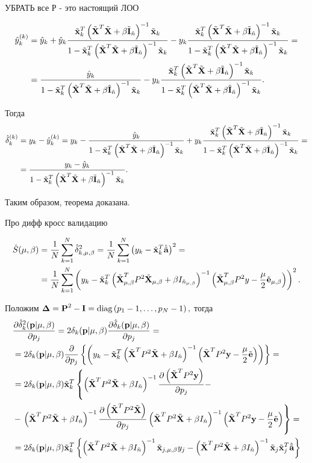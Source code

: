 УБРАТЬ все Р - это настоящий ЛОО

\begin{align}
	\hat y\this_k
		&= \hat y_k + \hat y_k\frac{\tilde{\mb x}_k^T\inv{\A} \tilde{\mb x}_k}{\denominator}
		- y_k\frac{\tilde{\mb x}^T_k\inv{\A}\tilde{\mb x}_k}{\denominator} = \\
		&= \frac{\hat y_k}{\denominator} - y_k\frac{\tilde{\mb x}^T_k\inv{\A}\tilde{\mb x}_k}{\denominator}.
\end{align}

Тогда
\begin{align}
	\hat{\delta}_k\this
	&= y_k - \hat y\this_k = y_k - \frac{\hat y_k}{\denominator} + y_k\frac{\tilde{\mb x}^T_k\inv{\A}\tilde{\mb x}_k}{\denominator} = \\
	&= \frac{y_k - \hat y_k}{\denominator}.
\end{align}

Таким образом, теорема доказана.


\begin{theorem}
Про дифф кросс валидацию
\end{theorem}

\begin{align}
	\hat S(\lams)
	&= \frac1N\suml_{k=1}^N\hat\delta_{k, \lams}^2
	= \frac1N\suml_{k=1}^N\cbr{y_k - \tilde {\mb x}_k^T \besta}^2 = \\
	&= \frac1N\suml_{k=1}^N
		\cbr{y_k - \tilde {\mb x}_k^T
		\inv{\tilde{\mb X}^T_\lams P^2\tilde{\mb X}_\lams + \beta I_{\hat n_\lams}}
		\cbr{\tilde{\mb X}^T_\lams P^2 y - \frac\mu2\tilde{\mb e}_\lams}
	}^2.
\end{align}

Положим $\mb \Delta = \mb P^2 - \mb I = \diag{p_1 - 1, \ldots, p_N - 1},$ тогда
\begin{align}
	&\dd{\hat\delta^2_k(\mb p \cond \lams)}{p_j}
	= 	2\delta_k(\mb p \cond \lams)\dd{\hat\delta_k(\mb p \cond \lams)}{p_j} = \\
	&= 	2\delta_k(\mb p \cond \lams)
		\dd{}{p_j}
		\fbr{
			\cbr{y_k - \tilde {\mb x}_k^T \inv{\tilde{\mb X}^T P^2\tilde{\mb X} + \beta I_{\hat n}}
			\cbr{\tilde{\mb X}^T P^2 \mb y -\frac\mu2\tilde{\mb e}}}
		} = \\
	&= 2\delta_k(\mb p \cond \lams) \tilde {\mb x}_k^T
	\left\{
		\inv{\tilde{\mb X}^T P^2\tilde{\mb X} + \beta I_{\hat n}}
	  	\dd{\cbr{\tilde{\mb X}^T P^2 \mb y}}{p_j} -
	  	\right. \\
	&- 	\left.
	   	\inv{\tilde{\mb X}^T P^2\tilde{\mb X} + \beta I_{\hat n}}
		\dd{\cbr{\tilde{\mb X}^T P^2\tilde{\mb X}}}{p_j}
		\inv{\tilde{\mb X}^T P^2\tilde{\mb X} + \beta I_{\hat n}}
		\cbr{\tilde{\mb X}^T P^2 \mb y -\frac\mu2\tilde{\mb e}}
	\right\} = \\
	&= 2\delta_k(\mb p \cond \lams) \tilde {\mb x}_k^T
	\fbr{
		\inv{\tilde{\mb X}^T P^2\tilde{\mb X} + \beta I_{\hat n}}
		\tilde{\mb x}_{j,\lams}y_j
		-
		\inv{\tilde{\mb X}^T P^2\tilde{\mb X} + \beta I_{\hat n}}
		\tilde{\mb x}_j \tilde{\mb x}^T_j
		\besta
	}
\end{align}

